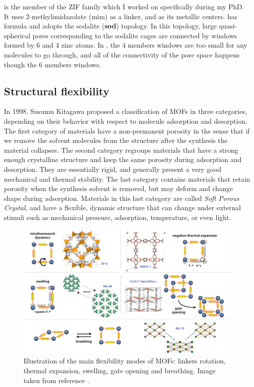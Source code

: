 \documentclass[thesis]{subfiles}
\begin{document}
 is the member of the ZIF family which I worked on specifically during my
PhD. It uses 2-methylimidazolate (mim) as a linker, and  as its
metallic centers.  has formula  and adopts the sodalite
(\textbf{sod}) topology. In this topology, large quasi-spherical pores
corresponding to the sodalite cages are connected by windows formed by 6 and 4
zinc atoms. In , the 4 members windows are too small for any molecules to
go through, and all of the connectivity of the pore space happens though the 6
members windows.

\subsection{Structural flexibility}

In 1998, Susumu Kitagawa proposed a classification of MOFs in three
categories\cite{Horike2009}, depending on their behavior with respect to
molecule adsorption and desorption. The first category of materials have a
non-permanent porosity in the sense that if we remove the solvent molecules from
the structure after the synthesis the material collapses. The second category
regroups materials that have a strong enough crystalline structure and keep the
same porosity during adsorption and desorption. They are essentially rigid, and
generally present a very good mechanical and thermal stability. The last
category contains materials that retain porosity when the synthesis solvent is
removed, but may deform and change shape during adsorption. Materials in this
last category are called \emph{Soft Porous Crystal}, and have a flexible,
dynamic structure that can change under external stimuli such as mechanical
pressure, adsorption, temperature, or even light\cite{Kitagawa2005,
Coudert2015}.

\begin{figure}[ht]
    \centering
    \includegraphics[width=\textwidth]{figures/cited/mof-flexibility}
    \caption{Illustration of the main flexibility modes of MOFs: linkers
    rotation, thermal expansion, swelling, gate opening and breathing. Image
    taken from reference~\cite{Coudert2011}.}
    \label{fig:mof-flexibility}
\end{figure}
\end{document}
